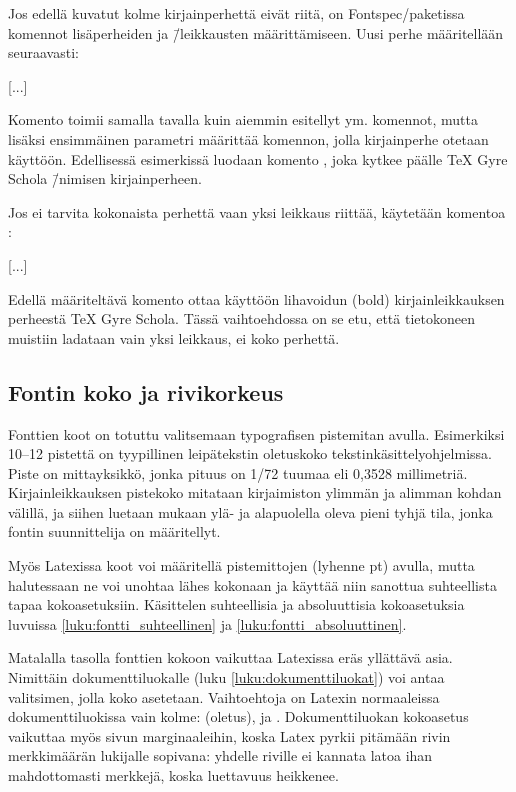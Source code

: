 Jos edellä kuvatut kolme kirjainperhettä eivät riitä, on
Fontspec\-/paketissa komennot lisäperheiden ja \=/leikkausten
määrittämiseen. Uusi perhe määritellään seuraavasti:

\begin{koodilohkosis}
  [...]
\end{koodilohkosis}

Komento  toimii samalla tavalla kuin aiemmin
esitellyt  ym. komennot, mutta lisäksi
ensimmäinen parametri määrittää komennon, jolla kirjainperhe otetaan
käyttöön. Edellisessä esimerkissä luodaan komento , joka kytkee päälle TeX Gyre Scho\-la \=/nimisen
kirjainperheen.
          
Jos ei tarvita kokonaista perhettä vaan yksi leikkaus riittää, käytetään
komentoa :

\begin{koodilohkosis}
  [...]
\end{koodilohkosis}

Edellä määriteltävä komento  ottaa käyttöön
lihavoidun (bold) kirjainleikkauksen perheestä TeX Gyre Scho\-la. Tässä
vaih\-to\-eh\-dos\-sa on se etu, että tietokoneen muistiin ladataan vain
yksi leikkaus, ei koko perhettä.

\subsection{Fontin koko ja rivikorkeus}

Fonttien koot on totuttu valitsemaan typografisen pistemitan avulla.
Esimerkiksi 10--12 pistettä on tyypillinen leipätekstin oletuskoko
teks\-tin\-kä\-sit\-tely\-ohjel\-mis\-sa. Piste on mitta\-yksikkö, jonka
pituus on 1/72 tuumaa eli 0,3528 millimetriä. Kirjainleikkauksen
pistekoko mitataan kirjaimiston ylimmän ja alimman kohdan välillä, ja
siihen luetaan mukaan ylä- ja alapuolella oleva pieni tyhjä tila, jonka
fontin suunnittelija on määritellyt.

Myös Latexissa koot voi määritellä pistemittojen (lyhenne pt) avulla,
mutta halutessaan ne voi unohtaa lähes kokonaan ja käyttää niin sanottua
suhteellista tapaa koko\-asetuksiin. Käsittelen suhteellisia ja
absoluuttisia koko\-ase\-tuk\-sia luvuissa
\ref{luku:fontti_suhteellinen} ja \ref{luku:fontti_absoluuttinen}.

Matalalla tasolla fonttien kokoon vaikuttaa Latexissa eräs yllättävä
asia. Nimittäin dokumenttiluokalle (luku \ref{luku:dokumenttiluokat})
voi antaa valitsimen, jolla koko asetetaan. Vaihtoehtoja on Latexin
normaaleissa dokumenttiluokissa vain kolme: \koodi{10pt} (oletus),
\koodi{11pt} ja \koodi{12pt}. Dokumenttiluokan koko\-asetus vaikuttaa
myös sivun marginaaleihin, koska Latex pyrkii pitämään rivin
merkkimäärän lukijalle sopivana: yhdelle riville ei kannata latoa ihan
mahdottomasti merkkejä, koska luettavuus heikkenee.

